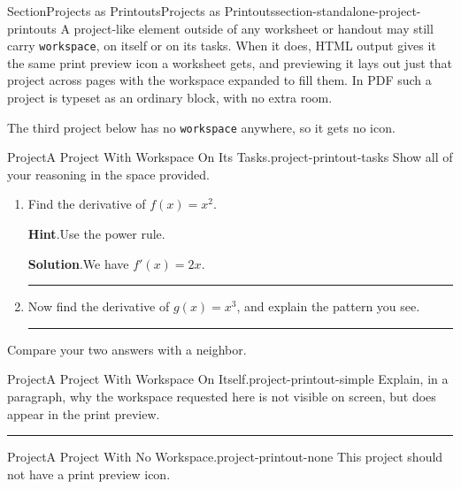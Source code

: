 \documentclass[oneside,10pt,]{article}
\newcommand{\blocktitlefont}{\relax}
\newcommand{\ptxmono}[1]{\texttt{#1}}
\newlength{\ptxworkspacestrutwidth}
\numberwithin{equation}{section}
\begin{document}
%
%
\typeout{************************************************}
\typeout{************************************************}
%
\begin{sectionptx}{Section}{Projects as Printouts}{}{Projects as Printouts}{}{}{section-standalone-project-printouts}
A project-like element outside of any worksheet or handout may still carry \ptxmono{workspace}, on itself or on its tasks. When it does, HTML output gives it the same print preview icon a worksheet gets, and previewing it lays out just that project across pages with the workspace expanded to fill them. In PDF such a project is typeset as an ordinary block, with no extra room.%
\par
The third project below has no \ptxmono{workspace} anywhere, so it gets no icon.%
\begin{project}{Project}{A Project With Workspace On Its Tasks.}{project-printout-tasks}%
Show all of your reasoning in the space provided.%
\begin{enumerate}[font=\bfseries,label=(\alph*),ref=\alph*]%
\item\label{project-printout-task-first}Find the derivative of \(f(x) = x^2\).%
\par\smallskip%
\noindent\textbf{\blocktitlefont Hint}.\hypertarget{project-printout-task-first-2}{}\quad{}Use the power rule.%
\par\smallskip%
\noindent\textbf{\blocktitlefont Solution}.\hypertarget{project-printout-task-first-3}{}\quad{}We have \(f'(x) = 2x\).%
\par\rule{\ptxworkspacestrutwidth}{2in}%
\item\label{project-printout-task-second}Now find the derivative of \(g(x) = x^3\), and explain the pattern you see.%
\par\rule{\ptxworkspacestrutwidth}{3in}%
\end{enumerate}%
Compare your two answers with a neighbor.%
\end{project}%
\restoregeometry
{}
\begin{project}{Project}{A Project With Workspace On Itself.}{project-printout-simple}%
Explain, in a paragraph, why the workspace requested here is not visible on screen, but does appear in the print preview.%
\par\rule{\ptxworkspacestrutwidth}{4in}%
\end{project}%
\restoregeometry
\begin{project}{Project}{A Project With No Workspace.}{project-printout-none}%
This project should not have a print preview icon.%
\end{project}%
\end{sectionptx}
\end{document}
